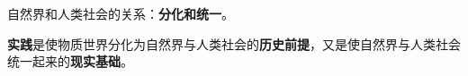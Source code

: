 自然界和人类社会的关系：\textbf{{分化和统一}}。

{\textbf{实践}}是使物质世界分化为自然界与人类社会的\textbf{{历史前提}}{，}又是使自然界与人类社会统一起来的{\textbf{现实基础}}。
